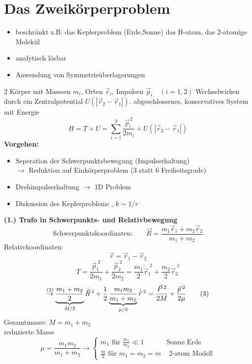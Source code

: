 \documentclass[titlepage,12pt,a4paper,ngerman]{report}
\newcommand{\tx}[1]{\textrm{#1}}
\newcommand{\ub}[1]{\underbrace{#1}}
\newcommand{\casess}[4]{\left\{ \begin{array}{ll} {#1} & {#2} \\ {#3} & {#4} \end{array} \right.}
\begin{document}

\section{Das Zweikörperproblem}
\begin{itemize}
	\item beschränkt z.B. das Keplerproblem (Erde,Sonne) das H-atom, das 2-atomige Molekül
	\item analytisch lösbar
	\item Anwendung von Symmetrieüberlagerungen
\end{itemize}
2 Körper mit Masssen $ m_i $, Orten $ \vec{r}_i $, Impulsen $ \vec{p}_i \quad (i= 1,2)$ Wechselwirken durch ein Zentralpotential $ U(|\vec{r}_2-\vec{r}_1|) $. abgeschlossenes, konservatives System mit Energie
\begin{equation*}
H = T+U = \sum_{i=1}^{2} \frac{\vec{p}^{\,2}_i}{2 m_i} +  U(|\vec{r}_2-\vec{r}_1|) \tag{1}
\end{equation*}
\textbf{Vorgehen:}
\begin{itemize}
	\item Seperation der Schwerpunktsbewegung (Impulserhaltung) \\
	$ \rightarrow $ Reduktion auf Einkörperproblem (3 statt 6 Freiheitsgrade)
	\item Drehimpulserhaltung $ \rightarrow $ 1D Problem
	\item Diskussion des Keplerproblems , $ k \sim 1/r $
\end{itemize}

\textbf{(1.) Trafo in Schwerpunkts- und Relativbewegung}
$$ \tx{Schwerpunktskoordinaten:} \qquad \vec{R} = \frac{m_1\vec{r}_1 + m_2\vec{r}_2}{m_1+m_2}$$
Relativkoordinaten: $$\vec{r} = \vec{r}_1 - \vec{r}_2$$
$$T = \frac{\vec{p}_1^{\;2}}{2m_1} + \frac{\vec{p}^{\;2}_2}{2m_2} = \frac{m_1}{2} \dot{\vec{r}}_1^{\;2} + \frac{m_2}{2} \dot{\vec{r}}_2^{\;2}$$
\begin{equation*}
\buildrel (2) \over \rightarrow  \ub{\frac{m_1+m_2}{2}}_{M / 2} \dot{\vec{R}}^{\,2} + \frac{1}{2} \ub{\frac{m_1 m_2}{ m_1 + m_2}}_{\mu / 2} \dot{\vec{r}}^{\;2} = \frac{\vec{P}^{\,2}}{2 M} + \frac{\vec{p}^{\;2}}{2 \mu} \tag{3}
\end{equation*}
Gesamtmasse: $ M = m_1 + m_2 $\\
reduzierte Masse 
$$ \mu = \frac{m_1 m_2}{m_1 + m_2} \rightarrow \casess{m_1 \tx{ für } \frac{m_1}{m_2} \ll 1}{\tx{Sonne Erde}}{\frac{m}{2} \tx{ für } m_1 = m_2 = m }{\tx{ 2-atom Modell}}$$
\end{document}
